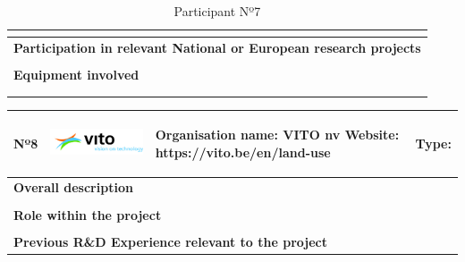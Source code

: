\begin{longtable}[H]{|p{0.7cm}|p{4cm}|p{7cm}|p{1.3cm}|}
	\multicolumn{4}{|p{13cm}|}{}  \\ \hline
	
	\multicolumn{4}{|p{13cm}|}{\textbf{Participation in relevant National or European research projects}}  \\ \hline
	
	\multicolumn{4}{|p{13cm}|}{}  \\ \hline
	
	\multicolumn{4}{|p{13cm}|}{\textbf{Equipment involved}}  \\ \hline
	
	\multicolumn{4}{|p{13cm}|}{}  \\ \hline
	\caption{Participant Nº7}
\end{longtable}

\begin{longtable}[H]{|p{0.7cm}|p{4cm}|p{7cm}|p{1.3cm}|}
	\hline
	\begin{center} Nº8 \end{center} & \begin{center} \includegraphics[scale=0.35]{./logos/vito-logo} \end{center} & \begin{center} \textbf{Organisation name:} VITO nv \newline \textbf{Website:} https://vito.be/en/land-use \end{center} & \begin{center} Type: \end{center} \\ \hline
	
	\multicolumn{4}{|p{13cm}|}{\textbf{Overall description}}  \\ \hline
	
	\multicolumn{4}{|p{13cm}|}{}  \\ \hline
	
	\multicolumn{4}{|p{13cm}|}{\textbf{Role within the project}}   \\ \hline
	
	\multicolumn{4}{|p{13cm}|}{}  \\ \hline
	
	\multicolumn{4}{|p{13cm}|}{\textbf{Previous R\&D Experience relevant to the project}}  \\ \hline
	

\end{longtable}
